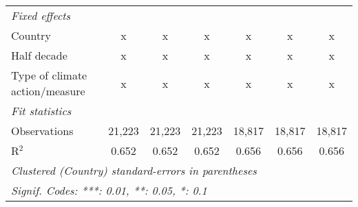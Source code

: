 \begin{tabular}{lcccccc}
   \emph{Fixed effects}\\
   Country                                                 & x             & x              & x              & x             & x             & x\\  
   Half decade                                             & x             & x              & x              & x             & x             & x\\  
   Type of climate action/measure                          & x             & x              & x              & x             & x             & x\\  
   \midrule \emph{Fit statistics}\\
   Observations                                            & 21,223        & 21,223         & 21,223         & 18,817        & 18,817        & 18,817\\  
   R$^2$                                                   & 0.652         & 0.652          & 0.652          & 0.656         & 0.656         & 0.656\\  
   \midrule
   \multicolumn{7}{l}{\emph{Clustered (Country) standard-errors in parentheses}}\\
   \multicolumn{7}{l}{\emph{Signif. Codes: ***: 0.01, **: 0.05, *: 0.1}}\\
\end{tabular}
\par\endgroup


